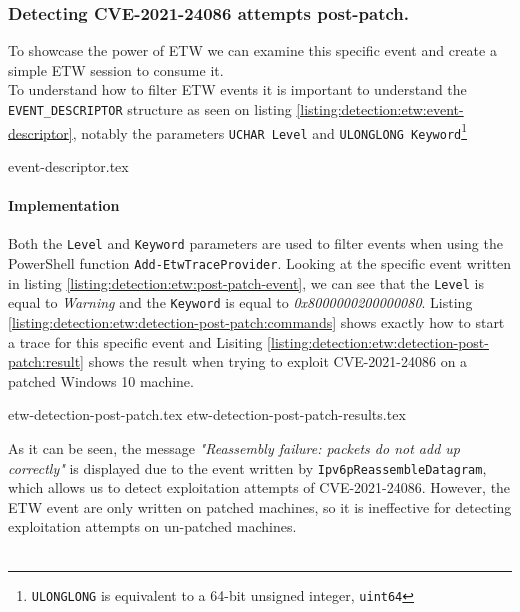 \documentclass{report}
\begin{document}
\subsubsection{Detecting CVE-2021-24086 attempts post-patch.}
To showcase the power of \gls{ETW} we can examine this specific event and create a simple \gls{ETW} session to consume it.
\\
To understand how to filter \gls{ETW} events it is important to understand the \texttt{EVENT_DESCRIPTOR} structure as seen on listing \ref{listing:detection:etw:event-descriptor}, notably the parameters \texttt{UCHAR Level} and \texttt{ULONGLONG Keyword}\footnote{\texttt{ULONGLONG} is equivalent to a 64-bit unsigned integer, \texttt{uint64}}

{event-descriptor.tex}

\paragraph{Implementation}
Both the \texttt{Level} and \texttt{Keyword} parameters are used to filter events when using the PowerShell function \texttt{Add-EtwTraceProvider}. Looking at the specific event written in listing \ref{listing:detection:etw:post-patch-event}, we can see that the \texttt{Level} is equal to \emph{Warning}\cite{url:etw:etw-event-descriptor} and the \texttt{Keyword} is equal to \emph{0x8000000200000080}. Listing \ref{listing:detection:etw:detection-post-patch:commands} shows exactly how to start a trace for this specific event and Lisiting \ref{listing:detection:etw:detection-post-patch:result} shows the result when trying to exploit CVE-2021-24086 on a patched Windows 10 machine.

{etw-detection-post-patch.tex}
{etw-detection-post-patch-results.tex}

As it can be seen, the message \emph{"Reassembly failure: packets do not add up correctly"} is displayed due to the event written by \texttt{Ipv6pReassembleDatagram}, which allows us to detect exploitation attempts of CVE-2021-24086. However, the \gls{ETW} event are only written on patched machines, so it is ineffective for detecting exploitation attempts on un-patched machines.
\\
\\
\end{document}
